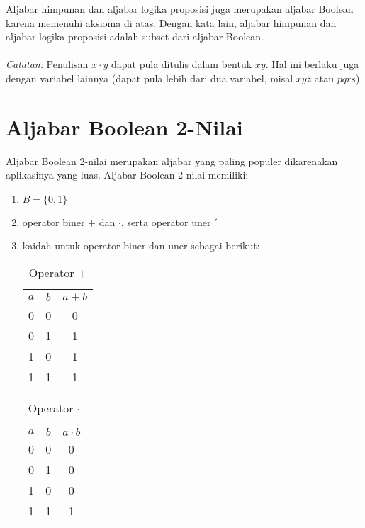 \documentclass[11pt]{article}
\theoremstyle{definitionstyle}
\theoremstyle{theoremstyle}
\theoremstyle{examplestyle}
\begin{document}
Aljabar himpunan dan aljabar logika proposisi juga merupakan aljabar Boolean karena memenuhi aksioma di atas. Dengan kata lain, aljabar himpunan dan aljabar logika proposisi adalah subset dari aljabar Boolean. \\ \\
\textit{Catatan:} Penulisan $x \cdot y$ dapat pula ditulis dalam bentuk $xy$. Hal ini berlaku juga dengan variabel lainnya (dapat pula lebih dari dua variabel, misal $xyz$ atau $pqrs$) \\
\section{Aljabar Boolean 2-Nilai}
\indent Aljabar Boolean 2-nilai merupakan aljabar yang paling populer dikarenakan aplikasinya yang luas. Aljabar Boolean 2-nilai memiliki:
\begin{enumerate}[left=0pt, itemsep=1.5pt, topsep=1.5pt, label=\roman*)]
    \item $B = \{0,1\}$
    \item operator biner $+$ dan $\cdot$, serta operator uner $'$
    \item kaidah untuk operator biner dan uner sebagai berikut:
    \begin{multicols}{3}
        \begin{table}[H]
            \centering
            \begin{tabular}{|c|c|c|}
                \hline
                $a$ & $b$ & $a + b$ \\
                \hline
                0 & 0 & 0 \\
                0 & 1 & 1 \\
                1 & 0 & 1 \\
                1 & 1 & 1 \\
                \hline
            \end{tabular}
            \caption{Operator $+$}
        \end{table}
        
        \columnbreak
        
        \begin{table}[H]
            \centering
            \begin{tabular}{|c|c|c|}
                \hline
                $a$ & $b$ & $a \cdot b$ \\
                \hline
                0 & 0 & 0 \\
                0 & 1 & 0 \\
                1 & 0 & 0 \\
                1 & 1 & 1 \\
                \hline
            \end{tabular}
            \caption{Operator $\cdot$}
        \end{table}
        

\end{multicols}
\end{enumerate}
\end{document}
